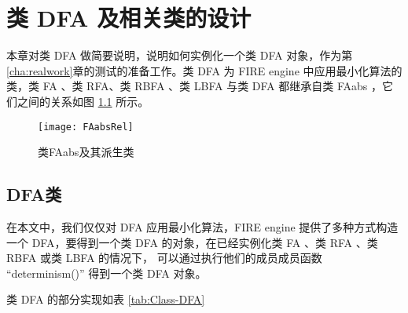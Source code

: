 \chapter{类 DFA 及相关类的设计}\label{cha:construct-dfa}

本章对类 DFA 做简要说明，说明如何实例化一个类 DFA 对象，作为第\ref{cha:realwork}章的测试的准备工作。类 DFA 为 FIRE engine 中应用最小化算法的类，类 FA 、类 RFA、类 RBFA 、类 LBFA 与类 DFA 都继承自类 FAabs ，它们之间的关系如图 \ref{fig:FAabsRel} 所示。

\begin{figure}[!htbp]
    \centering
    \texttt{[image: FAabsRel]}
    \caption{类FAabs及其派生类}
    \label{fig:FAabsRel}
\end{figure}

\section{DFA类}
在本文中，我们仅仅对 DFA 应用最小化算法，FIRE engine 提供了多种方式构造一个 DFA，要得到一个类 DFA 的对象，在已经实例化类 FA 、类 RFA 、类 RBFA 或类 LBFA 的情况下， 可以通过执行他们的成员成员函数 “determinism()” 得到一个类 DFA 对象。


类 DFA 的部分实现如表 \ref{tab:Class-DFA} 

